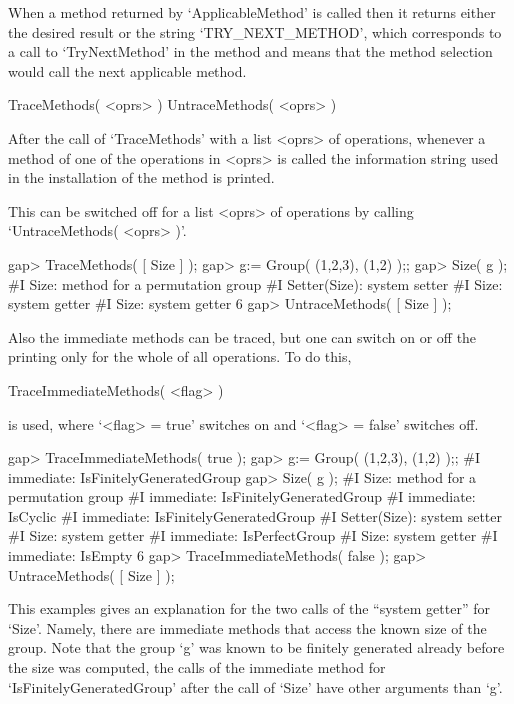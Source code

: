 When a method returned by `ApplicableMethod' is called then
it returns either the desired result or the string `TRY_NEXT_METHOD',
which corresponds to a call to `TryNextMethod' in the method
and means that the method selection would call the next applicable
method.



\>TraceMethods( <oprs> )
\>UntraceMethods( <oprs> )

After the call of `TraceMethods' with a list <oprs> of operations,
whenever a method of one of the operations in <oprs> is called
the information string used in the installation of the method is printed.

This can be switched off for a list <oprs> of operations by calling
`UntraceMethods( <oprs> )'.

\beginexample
    gap> TraceMethods( [ Size ] );
    gap> g:= Group( (1,2,3), (1,2) );;
    gap> Size( g );
    #I  Size: method for a permutation group
    #I  Setter(Size): system setter
    #I  Size: system getter
    #I  Size: system getter
    6
    gap> UntraceMethods( [ Size ] );
\endexample

Also the immediate methods can be traced, but one can switch on or off
the printing only for the whole of all operations.
To do this,

\>TraceImmediateMethods( <flag> )

is used, where `<flag> = true' switches on and `<flag> = false'
switches off.

\beginexample
    gap> TraceImmediateMethods( true );
    gap> g:= Group( (1,2,3), (1,2) );;
    #I  immediate: IsFinitelyGeneratedGroup
    gap> Size( g );
    #I  Size: method for a permutation group
    #I  immediate: IsFinitelyGeneratedGroup
    #I  immediate: IsCyclic
    #I  immediate: IsFinitelyGeneratedGroup
    #I  Setter(Size): system setter
    #I  Size: system getter
    #I  immediate: IsPerfectGroup
    #I  Size: system getter
    #I  immediate: IsEmpty
    6
    gap> TraceImmediateMethods( false );
    gap> UntraceMethods( [ Size ] );
\endexample

This examples gives an explanation for the two calls of the
``system getter'' for `Size'.
Namely, there are immediate methods that access the known size
of the group.
Note that the group `g' was known to be finitely generated already
before the size was computed,
the calls of the immediate method for `IsFinitelyGeneratedGroup'
after the call of `Size' have other arguments than `g'.


